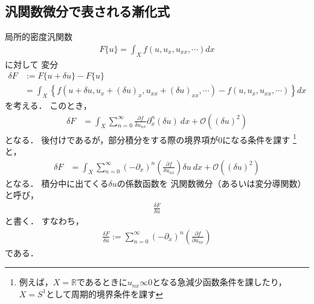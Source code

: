 \documentclass[dvipdfmx,12pt,a4paper,uplatex]{jsarticle}
\theoremstyle{plain}
\theoremstyle{definition}
\begin{document}
\subsection{汎関数微分で表される漸化式}
局所的密度汎関数
\begin{align}
F\{u\} = \int_X f(u,u_x,u_{xx},\cdots)dx
\end{align}
に対して
変分
\begin{align}
\delta F 
&:= F\{u+\delta u\} - F\{u\} \nonumber\\
&=
\int_X 
\left\{ f(u+\delta u,u_x + (\delta u)_x ,
u_{xx} + (\delta u)_{xx},\cdots) - f(u,u_x,u_{xx},\cdots) \right\}dx
\end{align}
を考える．
このとき，
\begin{align}
\delta F 
&=
\int_X 
\sum_{n=0}^\infty
\frac{\partial f}{\delta u_{nx}}\partial_x^n(\delta u)\ dx 
+
\mathcal{O}((\delta u)^2)
\end{align}
となる．
後付けであるが，部分積分をする際の境界項が0になる条件を課す
\footnote{例えば，$X=\mathbb{R}$であるときに$u_{nx}\infty0$となる急減少函数条件を課したり，$X=S^1$として周期的境界条件を課す}
と，
\begin{align}
\delta F 
&=
\int_X 
\sum_{n=0}^\infty(-\partial_x)^n
\left(
\frac{\partial f}{\delta u_{nx}}
\right)\delta u\ 
dx 
+
\mathcal{O}((\delta u)^2)
\end{align}
となる．
積分中に出てくる$\delta u$の係数函数を
汎関数微分（あるいは変分導関数）と呼び，
\begin{align*}
\frac{\delta F}{\delta u}
\end{align*}
と書く．
すなわち，
\begin{align}
\frac{\delta F}{\delta u} :=
\sum_{n=0}^\infty (-\partial_x)^n
\left(
\frac{\partial f}{\partial u_{nx}}
\right)
\end{align}
である．
\end{document}
